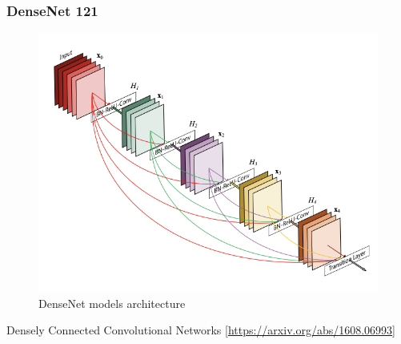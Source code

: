 \documentclass{beamer}
\begin{document}
\begin{frame}
\frametitle{DenseNet 121}

\begin{figure}
	\centering
	\includegraphics[scale=0.6]{images/model.png}
	\caption*{DenseNet models architecture} 
\end{figure}

\begin{center}
Densely Connected Convolutional Networks [\url{https://arxiv.org/abs/1608.06993}]
\end{center}

\end{frame}

\end{document}
